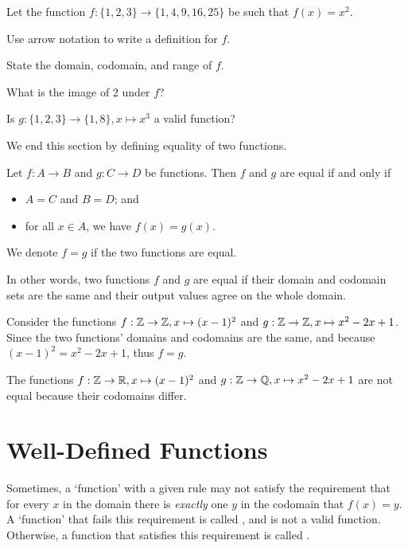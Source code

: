 \begin{exercise}
    Let the function $f: \{1, 2, 3\} \to \{1, 4, 9, 16, 25\}$ be such that $f(x) = x^2$.
    \begin{partquestions}{\roman*}
        \item Use arrow notation to write a definition for $f$.
        \item State the domain, codomain, and range of $f$.
        \item What is the image of 2 under $f$?
        \item Is $g: \{1, 2, 3\} \to \{1, 8\}, x \mapsto x^3$ a valid function?
    \end{partquestions}
\end{exercise}

We end this section by defining equality of two functions.
\begin{definition}
    Let $f: A \to B$ and $g: C \to D$ be functions. Then $f$ and $g$ are equal if and only if
    \begin{itemize}
        \item $A = C$ and $B = D$; and
        \item for all $x \in A$, we have $f(x) = g(x)$.
    \end{itemize}
    We denote $f = g$ if the two functions are equal.
\end{definition}

In other words, two functions $f$ and $g$ are equal if their domain and codomain sets are the same and their output values agree on the whole domain.

\begin{example}
    Consider the functions $f: \mathbb{Z} \to \mathbb{Z}, x \mapsto (x-1)^2$ and $g: \mathbb{Z} \to \mathbb{Z}, x \mapsto x^2 - 2x + 1$. Since the two functions' domains and codomains are the same, and because $(x-1)^2 = x^2 - 2x + 1$, thus $f = g$.
\end{example}

\begin{example}
    The functions $f: \mathbb{Z} \to \mathbb{R}, x \mapsto (x-1)^2$ and $g: \mathbb{Z} \to \mathbb{Q}, x \mapsto x^2 - 2x + 1$ are not equal because their codomains differ.
\end{example}

\section{Well-Defined Functions}
Sometimes, a `function' with a given rule may not satisfy the requirement that for every $x$ in the domain there is \textit{exactly} one $y$ in the codomain that $f(x) = y$. A `function' that fails this requirement is called , and is not a valid function. Otherwise, a function that satisfies this requirement is called .

